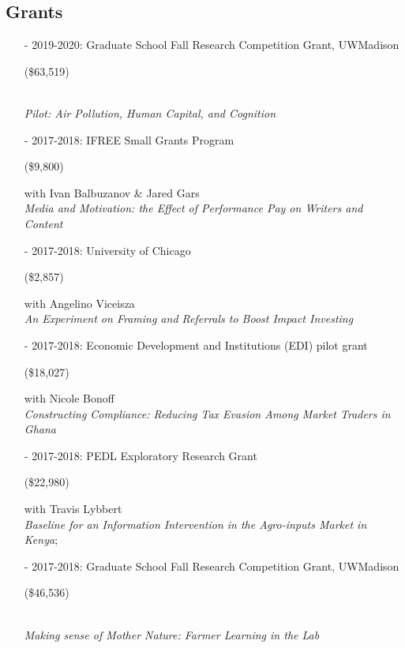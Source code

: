 \documentclass[11pt]{article}
\begin{document}
\subsection*{\sc Grants }

\begin{itemize}[itemsep=0pt, leftmargin=20pt]
\item [-]2019-2020: Graduate School Fall Research Competition Grant, UW\textendash Madison 
\begin{money}
(\$63,519) 
\end{money}
\\ \emph{Pilot: Air Pollution, Human Capital, and Cognition}

\item [-]2017-2018: IFREE Small Grants Program
\begin{money}
(\$9,800)
\end{money}
with Ivan Balbuzanov \& Jared Gars \\
\emph{Media and Motivation: the Effect of Performance Pay on Writers and Content}


\item [-]2017-2018: University of Chicago
\begin{money}
(\$2,857)
\end{money}
with Angelino Viceisza \\
\emph{An Experiment on Framing and Referrals to Boost Impact Investing
}

\item [-]2017-2018: Economic Development and Institutions (EDI) pilot
grant
\begin{money}
(\$18,027)
\end{money}
with Nicole Bonoff \\
\emph{Constructing Compliance: Reducing Tax Evasion Among Market Traders in Ghana} 

\item [-]2017-2018: PEDL Exploratory Research Grant 
\begin{money}
(\$22,980) 
\end{money}
with Travis Lybbert \\
\emph{Baseline for an Information Intervention in the Agro-inputs Market in Kenya};

\item [-]2017-2018: Graduate School Fall Research Competition Grant,
UW\textendash Madison
\begin{money}
(\$46,536)
\end{money}
\\ \emph{Making sense of Mother Nature: Farmer Learning in the Lab}


\end{itemize}
\end{document}
